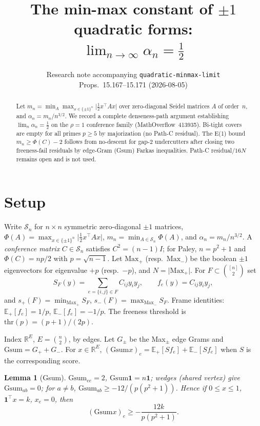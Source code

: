 \documentclass[10pt]{article}
\title{\vspace{-0.8em}\bfseries
The min-max constant of $\pm1$ quadratic forms:\\[0.15em]
$\displaystyle\lim_{n\to\infty}\alpha_n=\tfrac12$
}
\author{%
Research note accompanying \texttt{quadratic-minmax-limit}\\
Props.\ 15.167--15.171 \quad(2026-08-05)
}
\date{}
\theoremstyle{plain}
\newtheorem{lemma}[theorem]{Lemma}
\theoremstyle{remark}
\newcommand{\Maxp}{\mathrm{Max}_{+}}
\newcommand{\Maxm}{\mathrm{Max}_{-}}
\newcommand{\Gsum}{\mathrm{Gsum}}
\newcommand{\ES}{\mathbb{E}}
\newcommand{\thr}{\mathrm{thr}}
\begin{document}
\maketitle
\thispagestyle{empty}
\vspace{-1.4em}

\begin{abstract}
\noindent
Let $m_n=\min_A\max_{x\in\{\pm1\}^n}\lvert\tfrac12 x^\top A x\rvert$ over zero-diagonal
Seidel matrices $A$ of order~$n$, and $\alpha_n=m_n/n^{3/2}$.
We record a complete denseness-path argument establishing
$\lim_n\alpha_n=\tfrac12$ on the $\rho=1$ conference family
(MathOverflow~413935).
Bi-tight covers are empty for all primes $p\ge5$ by majorization (no Path-C residual).
The E(1) bound $m_n\ge\Phi(C)-2$ follows from no-descent for gap-$2$ undercutters after
closing two freeness-fail residuals by edge-Gram (Gsum) Farkas inequalities.
Path-C residual/$16N$ remains open and is not used.
\end{abstract}

\section{Setup}

Write $\mathcal S_n$ for $n\times n$ symmetric zero-diagonal $\pm1$ matrices,
$\Phi(A)=\max_{x\in\{\pm1\}^n}\lvert\tfrac12 x^\top Ax\rvert$,
$m_n=\min_{A\in\mathcal S_n}\Phi(A)$, and $\alpha_n=m_n/n^{3/2}$.
A \emph{conference matrix} $C\in\mathcal S_n$ satisfies $C^2=(n-1)I$; for Paley,
$n=p^2+1$ and $\Phi(C)=np/2$ with $p=\sqrt{n-1}$.
Let $\Maxp$ (resp.\ $\Maxm$) be the boolean $\pm1$ eigenvectors for eigenvalue $+p$
(resp.\ $-p$), and $N=\lvert\Maxp\rvert$.
For $F\subset\binom{[n]}{2}$ set
\[
S_F(y)=\sum_{e=\{i,j\}\in F}C_{ij}y_iy_j,\qquad
f_e(y)=C_{ij}y_iy_j,
\]
and $s_+(F)=\min_{\Maxp}S_F$, $s_-(F)=\max_{\Maxm}S_F$.
Frame identities: $\ES_+[f_e]=1/p$, $\ES_-[f_e]=-1/p$.
The freeness threshold is $\thr(p)=(p+1)/(2p)$.

Index $\mathbb R^E$, $E=\binom n2$, by edges. Let $G_\pm$ be the Max$_{\pm}$ edge Grams
and $\Gsum=G_++G_-$. For $x\in\mathbb R^E$,
$(\Gsum x)_e=\ES_+[Sf_e]+\ES_-[Sf_e]$ when $S$ is the corresponding score.

\begin{lemma}[Gsum]
\label{lem:gsum}
$\Gsum_{ee}=2$, $\Gsum\mathbf1=n\mathbf1$; wedges (shared vertex) give $\Gsum_{ab}=0$;
for $a\neq b$, $\Gsum_{ab}\ge-12/(p(p^2+1))$.
Hence if $0\le x\le1$, $\mathbf1^\top x=k$, $x_e=0$, then
\[
(\Gsum x)_e\ge-\frac{12k}{p(p^2+1)}.
\]
\end{lemma}
\end{document}
